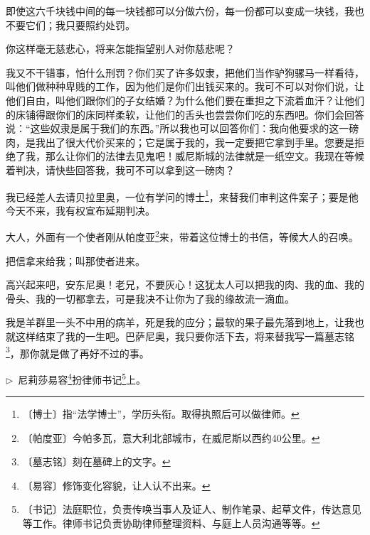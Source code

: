 \documentclass[12pt,UTF-8,openany]{ctexbook}
\begin{document}
\begin{large}
\begin{description}[itemsep=1ex,leftmargin=4.5em,labelwidth=4em]
    \item[{\color{script-1-3} 沙义洛}]即使这六千块钱中间的每一块钱都可以分做六份，每一份都可以变成一块钱，我也不要它们；我只要照约处罚。
    
    \item[{\color{script-1-0} 公爵}]你这样毫无慈悲心，将来怎能指望别人对你慈悲呢？
    
    \item[{\color{script-1-3} 沙义洛}]我又不干错事，怕什么刑罚？你们买了许多奴隶，把他们当作驴狗骡马一样看待，叫他们做种种卑贱的工作，因为他们是你们出钱买来的。我可不可以对你们说，让他们自由，叫他们跟你们的子女结婚？为什么他们要在重担之下流着血汗？让他们的床铺得跟你们的床同样柔软，让他们的舌头也尝尝你们吃的东西吧。你们会回答说：“这些奴隶是属于我们的东西。”所以我也可以回答你们：我向他要求的这一磅肉，是我出了很大代价买来的；它是属于我的，我一定要把它拿到手里。您要是拒绝了我，那么让你们的法律去见鬼吧！威尼斯城的法律就是一纸空文。我现在等候着判决，请快些回答我，我可不可以拿到这一磅肉？
    
    \item[{\color{script-1-0} 公爵}]我已经差人去请贝拉里奥，一位有学问的博士\footnote{〔博士〕指“法学博士”，学历头衔。取得执照后可以做律师。}，来替我们审判这件案子；要是他今天不来，我有权宣布延期判决。
    
    \item[{\color{script-1-2} 萨拉里诺}]大人，外面有一个使者刚从帕度亚\footnote{〔帕度亚〕今帕多瓦，意大利北部城市，在威尼斯以西约40公里。}来，带着这位博士的书信，等候大人的召唤。
    
    \item[{\color{script-1-0} 公爵}]把信拿来给我；叫那使者进来。
    
    \item[{\color{script-1-4} 巴萨尼奥}]高兴起来吧，安东尼奥！老兄，不要灰心！这犹太人可以把我的肉、我的血、我的骨头、我的一切都拿去，可是我决不让你为了我的缘故流一滴血。
    
    \item[{\color{script-1-1} 安东尼奥}]我是羊群里一头不中用的病羊，死是我的应分；最软的果子最先落到地上，让我也就这样结束了我的一生吧。巴萨尼奥，我只要你活下去，将来替我写一篇墓志铭\footnote{〔墓志铭〕刻在墓碑上的文字。}，那你就是做了再好不过的事。
    
    \end{description}
    
    \noindent $\triangleright$~尼莉莎易容\footnote{〔易容〕修饰变化容貌，让人认不出来。}扮律师书记\footnote{〔书记〕法庭职位，负责传唤当事人及证人、制作笔录、起草文件，传达意见等工作。律师书记负责协助律师整理资料、与庭上人员沟通等等。}上。
    

\end{large}
\end{document}
